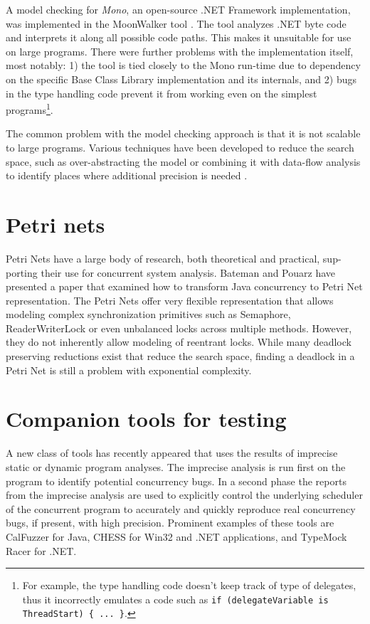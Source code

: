 A model checking for \emph{Mono}, an open-source .NET Framework implementation, was implemented in the MoonWalker tool \citep{AanDeBrugh2009}. The tool analyzes .NET byte code and interprets it along all possible code paths. This makes it unsuitable for use on large programs. There were further problems with the implementation itself, most notably: 1) the tool is tied closely to the Mono run-time due to dependency on the specific Base Class Library implementation and its internals, and 2) bugs in the type handling code prevent it from working even on the simplest programs\footnote{For example, the type handling code doesn't keep track of type of delegates, thus it incorrectly emulates a code such as \texttt{if (delegateVariable is ThreadStart) \{ ... \}}.}.

The common problem with the model checking approach is that it is not scalable to large programs. Various techniques have been developed to reduce the search space, such as over-abstracting the model or combining it with data-flow analysis to identify places where additional precision is needed \citep{Brown2007}.

\section{Petri nets}

Petri Nets have a large body of research, both theoretical and practical, sup-porting their use for concurrent system analysis. Bateman and Pouarz have presented a paper \citep{Bateman2002} that examined how to transform Java concurrency to Petri Net representation. The Petri Nets offer very flexible representation that allows modeling complex synchronization primitives such as Semaphore, ReaderWriterLock or even unbalanced locks across multiple methods. However, they do not inherently allow modeling of reentrant locks. While many deadlock preserving reductions exist that reduce the search space, finding a deadlock in a Petri Net is still a problem with exponential complexity.    

\section{Companion tools for testing}

A new class of tools has recently appeared that uses the results of imprecise static or dynamic program analyses. The imprecise analysis is run first on the program to identify potential concurrency bugs. In a second phase the reports from the imprecise analysis are used to explicitly control the underlying scheduler of the concurrent program to accurately and quickly reproduce real concurrency bugs, if present, with high precision. Prominent examples of these tools are CalFuzzer \citep{Joshi2009} for Java, CHESS \citep{Musuvathi2007} for Win32 and .NET applications, and TypeMock Racer \citep{TypeMockRacer} for .NET.
